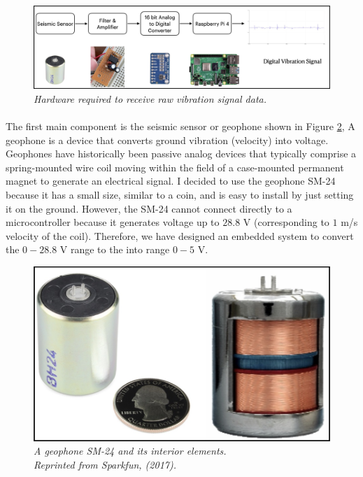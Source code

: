  \begin{figure}[h]
  \centering
  \caption[Hardware required to receive raw vibration signal data.]{\emph{Hardware required to receive raw vibration signal data. \\}}\label{fig:hardware}
  \includegraphics[scale = 0.2]{figures/hardware.jpg}  
\end{figure}

\paragraph{}
The first main component is the seismic sensor or geophone shown in Figure \ref{fig:seismic}, A geophone is a device that converts ground vibration (velocity) into voltage. Geophones have historically been passive analog devices that typically comprise a spring-mounted wire coil moving within the field of a case-mounted permanent magnet to generate an electrical signal. I decided to use the geophone SM-24 because it has a small size, similar to a coin, and is easy to install by just setting it on the ground. However, the SM-24 cannot connect directly to a microcontroller because it generates voltage up to $28.8$ V (corresponding to $1$ m/s velocity of the coil). Therefore, we have designed an embedded system to convert the $0 - 28.8$ V range to the into range $0 - 5$ V.

\begin{figure}[H]
  \centering
  \caption[A geophone SM-24 and its interior elements.]{\emph{A geophone SM-24 and its interior elements. \\Reprinted from Sparkfun, (2017). }}\label{fig:seismic}
  \includegraphics[scale = 0.25]{figures/seismic.jpg}  
\end{figure}

